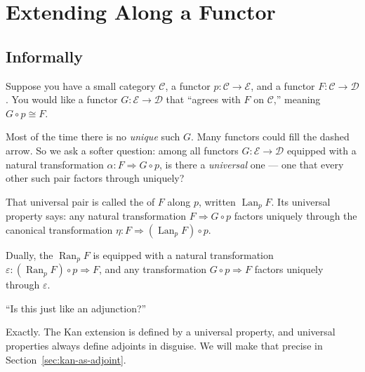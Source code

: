 \section{Extending Along a Functor}

\subsection{Informally}

Suppose you have a small category $\mathcal{C}$, a functor
$p : \mathcal{C} \to \mathcal{E}$, and a functor $F : \mathcal{C} \to \mathcal{D}$.
You would like a functor $G : \mathcal{E} \to \mathcal{D}$ that ``agrees with $F$
on $\mathcal{C}$,'' meaning $G \circ p \cong F$.

\begin{center}
\end{center}

Most of the time there is no \emph{unique} such $G$. Many functors could fill the
dashed arrow. So we ask a softer question: among all functors
$G : \mathcal{E} \to \mathcal{D}$ equipped with a natural transformation
$\alpha : F \Rightarrow G \circ p$, is there a \emph{universal} one — one that every
other such pair factors through uniquely?

That universal pair is called the  of $F$ along $p$,
written $\operatorname{Lan}_p F$. Its universal property says: any natural
transformation $F \Rightarrow G \circ p$ factors uniquely through the canonical
transformation $\eta : F \Rightarrow (\operatorname{Lan}_p F) \circ p$.

Dually, the  $\operatorname{Ran}_p F$ is equipped with
a natural transformation $\varepsilon : (\operatorname{Ran}_p F) \circ p \Rightarrow F$,
and any transformation $G \circ p \Rightarrow F$ factors uniquely through $\varepsilon$.

\begin{dialog}
``Is this just like an adjunction?''

Exactly. The Kan extension is defined by a universal property, and universal
properties always define adjoints in disguise. We will make that precise in
Section~\ref{sec:kan-as-adjoint}.
\end{dialog}

